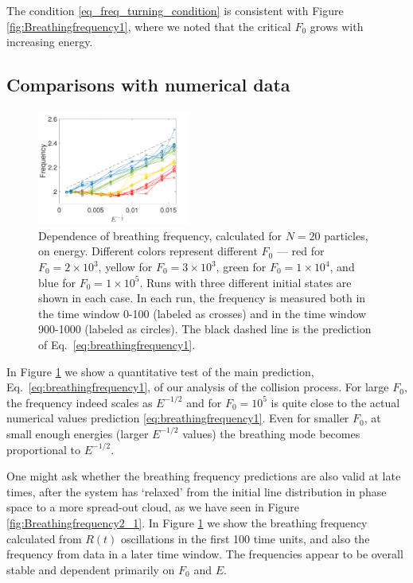 \documentclass[a4paper, onecolumn]{revtex4-1}
\begin{document}
The condition \eqref{eq_freq_turning_condition} is consistent with Figure
\ref{fig:Breathingfrequency1}, where we noted that the critical $F_0$ grows with increasing energy.


\subsection{Comparisons with numerical data}


\begin{figure}[tb]
\centering
\includegraphics[width=0.45\textwidth]{ZhiyuPictures/N_20_freq_vs_E_a.pdf}
\caption{Dependence of breathing frequency, calculated for $N=20$ particles, on energy.  Different
  colors represent different $F_0$ --- red for $F_0=2\times10^3$, yellow for $F_0=3\times10^3$,
  green for $F_0=1\times10^4$, and blue for $F_0=1\times10^5$.  Runs with three different initial
  states are shown in each case.  In each run, the frequency is measured both in the time window
  0-100 (labeled as crosses) and in the time window 900-1000 (labeled as circles). The black dashed
  line is the prediction of Eq.~\eqref{eq:breathingfrequency1}.}
\label{fig:Breathingfrequency4}
\end{figure}


In Figure \ref{fig:Breathingfrequency4} we show a quantitative test of the main prediction,
Eq.~\eqref{eq:breathingfrequency1}, of our analysis of the collision process.  For large $F_0$, the
frequency indeed scales as $E^{-1/2}$ and for $F_0=10^5$ is quite close to the actual numerical
values prediction \eqref{eq:breathingfrequency1}.  Even for smaller $F_0$, at small enough energies
(larger $E^{-1/2}$ values) the breathing mode becomes proportional to $E^{-1/2}$.

One might ask whether the breathing frequency predictions are also valid at late times, after the
system has `relaxed' from the initial line distribution in phase space to a more spread-out cloud,
as we have seen in Figure \ref{fig:Breathingfrequency2_1}.  In Figure \ref{fig:Breathingfrequency4}
we show the breathing frequency calculated from $R(t)$ oscillations in the first 100 time units, and
also the frequency from data in a later time window. The frequencies appear to be overall stable and
dependent primarily on $F_0$ and $E$.
\end{document}
